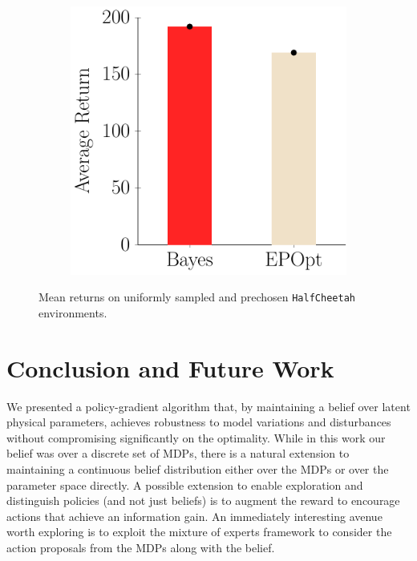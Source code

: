 \documentclass{article}
\begin{document}
\begin{figure}[t!]
\begin{centering}
\begin{subfigure}[b]{0.3\columnwidth}
\label{fig:oneFromK}
\end{subfigure}
~
\begin{subfigure}[b]{0.29\columnwidth}
\includegraphics[width=\linewidth]{figs/cheetah_average.pdf}
\label{fig:all20}
\end{subfigure}
\end{centering}
\caption{Mean returns on uniformly sampled and prechosen \texttt{HalfCheetah} environments.}
\label{fig:Bars}
\end{figure}



\section{Conclusion and Future Work}
We presented a policy-gradient algorithm that, by maintaining a belief over latent physical parameters, achieves robustness to model variations and disturbances without compromising significantly on the optimality.
While in this work our belief was over a discrete set of MDPs, there is a natural extension to maintaining a continuous belief distribution either over the MDPs or over the parameter space directly.
A possible extension to enable exploration and distinguish policies (and not just beliefs) is to augment the reward to encourage actions that achieve an information gain.
An immediately interesting avenue worth exploring is to exploit the mixture of experts framework to consider the action proposals from the MDPs along with the belief.
\end{document}
